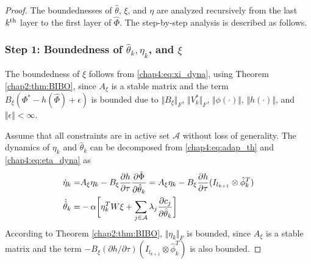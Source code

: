 \begin{proof}

The boundednesses of $\hat\theta$, $\xi$, and $\eta$ are analyzed recursively from the last $k\textsuperscript{th}$ layer to the first layer of $\hat\Phi$. 
The step-by-step analysis is described as follows.

\subsubsection{
    Step 1: Boundedness of $\hat\theta_k,\eta_k$, and $\xi$
}

The boundedness of $\xi$ follows from \eqref{chap4:eq:xi_dyna}, using Theorem \ref{chap2:thm:BIBO}, since $A_\xi$ is a stable matrix and the term $B_\xi (\Phi^*-h(\hat\Phi)+\epsilon)$ is bounded due to $\Vert B_\xi\Vert_F$, $\Vert V_k^*\Vert_F$, $\Vert \phi(\cdot)\Vert$, $\Vert h(\cdot)\Vert$, and $\Vert\epsilon\Vert <\infty$.

Assume that all constraints are in active set $\mathcal A$ without loss of generality. 
The dynamics of $\eta_k$ and $\hat\theta_k$ can be decomposed from \eqref{chap4:eq:adap_th} and \eqref{chap4:eq:eta_dyna} as 
\begin{equation}
    \begin{aligned}
        \dot\eta_k =
        & 
        A_\xi \eta_k -B_\xi {\partial h\over\partial\tau}{\partial \hat\Phi\over \partial \hat\theta_k}
        =
        A_\xi \eta_k -B_\xi {\partial h\over\partial\tau}(I_{l_{k+1}}\otimes \hat\phi_k^T)\\
        \dot{\hat\theta}_k =
        & -\alpha 
        \bigg[
            \eta_k^TW\xi+
            \sum_{j\in\mathcal{A}}
            \lambda_j{\partial c_j\over\partial \hat\theta_k}
        \bigg]
    \end{aligned} 
\end{equation}
According to Theorem \ref{chap2:thm:BIBO}, $\Vert \eta_k\Vert_F$ is bounded, since $A_\xi$ is a stable matrix and the term $-B_\xi(\partial h/\partial \tau)(I_{l_{k+1}}\otimes\hat\phi_k^T)$ is also bounded.


\end{proof}
